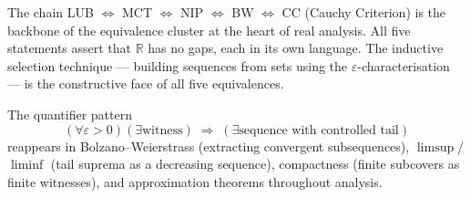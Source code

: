 \begin{remark}
The chain LUB $\Leftrightarrow$ MCT $\Leftrightarrow$ NIP $\Leftrightarrow$
BW $\Leftrightarrow$ CC (Cauchy Criterion) is the backbone of the equivalence
cluster at the heart of real analysis. All five statements assert that
$\mathbb{R}$ has no gaps, each in its own language. The inductive selection
technique --- building sequences from sets using the $\varepsilon$-characterisation
--- is the constructive face of all five equivalences.
\end{remark}

\begin{remark}
The quantifier pattern
\[
  (\forall\varepsilon>0)(\exists\text{witness})
  \;\Rightarrow\;
  (\exists\text{sequence with controlled tail})
\]
reappears in Bolzano--Weierstrass (extracting convergent subsequences),
$\limsup$/$\liminf$ (tail suprema as a decreasing sequence),
compactness (finite subcovers as finite witnesses), and approximation
theorems throughout analysis.
\end{remark}
